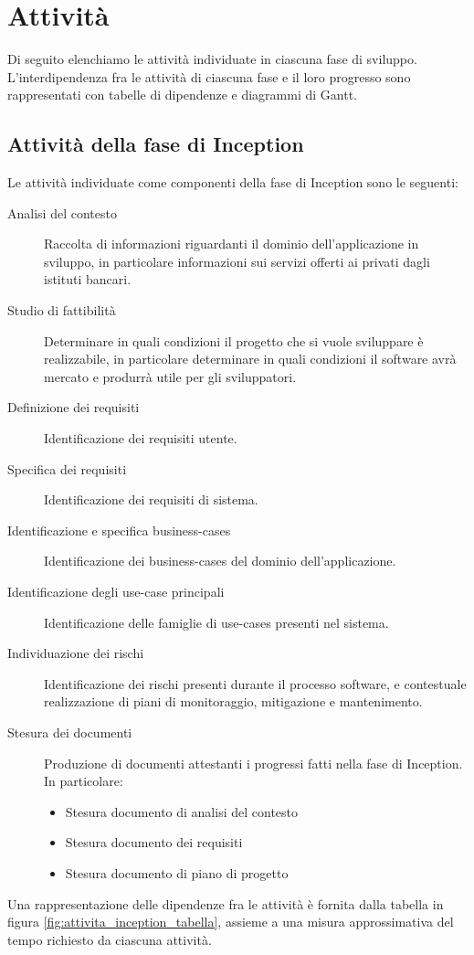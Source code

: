 \section{Attivit\`a}

Di seguito elenchiamo le attivit\`a individuate in ciascuna fase di sviluppo.
L'interdipendenza fra le attivit\`a di ciascuna fase e il loro progresso sono rappresentati con tabelle di dipendenze e diagrammi di Gantt.

\subsection{Attivit\`a della fase di Inception}

Le attivit\`a individuate come componenti della fase di Inception sono le seguenti:
\begin{description}
	\item[Analisi del contesto]
		Raccolta di informazioni riguardanti il dominio dell'applicazione in sviluppo, in particolare informazioni sui servizi offerti ai privati dagli istituti bancari.
	\item[Studio di fattibilit\`a]
		Determinare in quali condizioni il progetto che si vuole sviluppare \`e realizzabile, in particolare determinare in quali condizioni il software avr\`a mercato e produrr\`a utile per gli sviluppatori.
	\item[Definizione dei requisiti]
		Identificazione dei requisiti utente.
	\item[Specifica dei requisiti]
		Identificazione dei requisiti di sistema.
	\item[Identificazione e specifica business-cases]
		Identificazione dei business-cases del dominio dell'applicazione.
	\item[Identificazione degli use-case principali]
		Identificazione delle famiglie di use-cases presenti nel sistema.
	\item[Individuazione dei rischi]
		Identificazione dei rischi presenti durante il processo software, e contestuale realizzazione di piani di monitoraggio, mitigazione e mantenimento.
	\item[Stesura dei documenti]
		Produzione di documenti attestanti i progressi fatti nella fase di Inception.
		In particolare:
		\begin{itemize}
			\item Stesura documento di analisi del contesto
			\item Stesura documento dei requisiti
			\item Stesura documento di piano di progetto
		\end{itemize}
\end{description}
Una rappresentazione delle dipendenze fra le attivit\`a \`e fornita dalla tabella in figura \ref{fig:attivita_inception_tabella}, assieme a una misura approssimativa del tempo richiesto da ciascuna attivit\`a.

